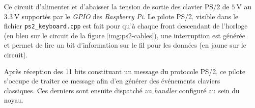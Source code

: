 \documentclass[french, 12pt]{article}
\newcommand{\rpi}{\emph{Raspberry Pi}}
\begin{document}
Ce circuit d'alimenter et d'abaisser la tension de sortie des clavier PS/2 de
$\SI{5}{\volt}$ au $\SI{3.3}{\volt}$ supportés par le \textit{GPIO} des \rpi{}.
Le pilote PS/2, visible dans le fichier \texttt{ps2\_keyboard.cpp} est fait pour
qu'à chaque front descendant de l'horloge (en bleu sur le circuit de la figure
\ref{img:ps2-cables}), une interruption est générée et permet de lire un
bit d'information sur le fil pour les données (en jaune sur le circuit).

Après réception des 11 bits constituant un message du protocole PS/2, ce pilote
s'occupe de traiter ce message afin d'en générer des événements claviers
classiques. Ces derniers sont ensuite dispatché au \textit{handler} configuré au
sein du noyau.
\end{document}
